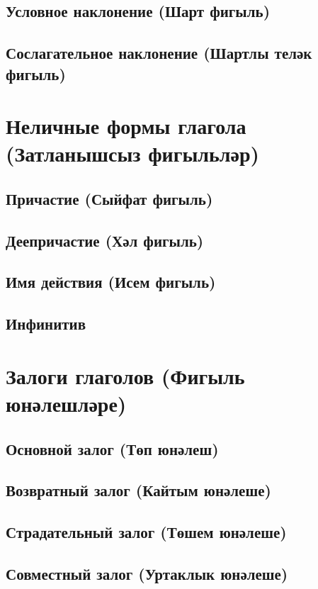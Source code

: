\subsection{Условное наклонение (Шарт фигыль)}
\subsection{Сослагательное наклонение (Шартлы теләк фигыль)}
\section{Неличные формы глагола (Затланышсыз фигыльләр)}
\subsection{Причастие (Сыйфат фигыль)}
\subsection{Деепричастие (Хәл фигыль)}
\subsection{Имя действия (Исем фигыль)}
\subsection{Инфинитив}





\section{Залоги глаголов (Фигыль юнәлешләре)}
\subsection{Основной залог (Төп юнәлеш)}
\subsection{Возвратный залог (Кайтым юнәлеше)}
\subsection{Страдательный залог (Төшем юнәлеше)}
\subsection{Совместный залог (Уртаклык юнәлеше)}
